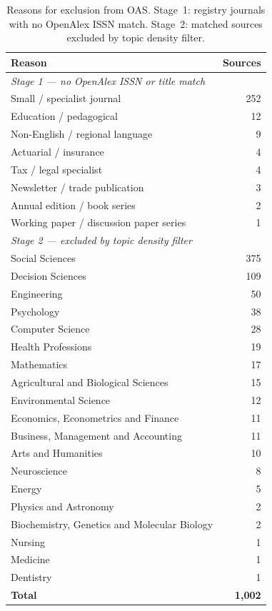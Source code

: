 \begin{table}[htbp]
\centering
\caption{Reasons for exclusion from OAS. Stage~1: registry journals with no OpenAlex ISSN match. Stage~2: matched sources excluded by topic density filter.}
\label{tab:oas_exclusions}
\begin{tabular}{lr}
\toprule
\textbf{Reason} & \textbf{Sources} \\
\midrule
\multicolumn{2}{l}{\textit{Stage 1 — no OpenAlex ISSN or title match}} \\
\quad Small / specialist journal & 252 \\
\quad Education / pedagogical & 12 \\
\quad Non-English / regional language & 9 \\
\quad Actuarial / insurance & 4 \\
\quad Tax / legal specialist & 4 \\
\quad Newsletter / trade publication & 3 \\
\quad Annual edition / book series & 2 \\
\quad Working paper / discussion paper series & 1 \\
\midrule
\multicolumn{2}{l}{\textit{Stage 2 — excluded by topic density filter}} \\
\quad Social Sciences & 375 \\
\quad Decision Sciences & 109 \\
\quad Engineering & 50 \\
\quad Psychology & 38 \\
\quad Computer Science & 28 \\
\quad Health Professions & 19 \\
\quad Mathematics & 17 \\
\quad Agricultural and Biological Sciences & 15 \\
\quad Environmental Science & 12 \\
\quad Economics, Econometrics and Finance & 11 \\
\quad Business, Management and Accounting & 11 \\
\quad Arts and Humanities & 10 \\
\quad Neuroscience & 8 \\
\quad Energy & 5 \\
\quad Physics and Astronomy & 2 \\
\quad Biochemistry, Genetics and Molecular Biology & 2 \\
\quad Nursing & 1 \\
\quad Medicine & 1 \\
\quad Dentistry & 1 \\
\midrule
\textbf{Total} & \textbf{1,002} \\
\bottomrule
\end{tabular}
\end{table}
